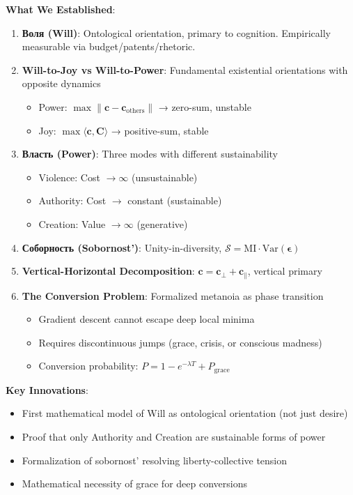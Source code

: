 \documentclass[11pt,a4paper]{article}
\theoremstyle{definition}
\theoremstyle{remark}
\newcommand{\cc}{\mathbf{c}}
\begin{document}
\begin{small}
\begin{enumerate}
\begin{mdframed}[backgroundcolor=green!10,linewidth=2pt,linecolor=green!70!black]
\textbf{What We Established}:
\begin{enumerate}[nosep]
    \item \textbf{Воля (Will)}: Ontological orientation, primary to cognition. Empirically measurable via budget/patents/rhetoric.
    \item \textbf{Will-to-Joy vs Will-to-Power}: Fundamental existential orientations with opposite dynamics
        \begin{itemize}[nosep]
            \item Power: \(\max \|\cc - \cc_{\text{others}}\|\) → zero-sum, unstable
            \item Joy: \(\max \langle \cc, \mathbf{C} \rangle\) → positive-sum, stable
        \end{itemize}
    \item \textbf{Власть (Power)}: Three modes with different sustainability
        \begin{itemize}[nosep]
            \item Violence: Cost \(\to \infty\) (unsustainable)
            \item Authority: Cost \(\to\) constant (sustainable)
            \item Creation: Value \(\to \infty\) (generative)
        \end{itemize}
    \item \textbf{Соборность (Sobornost')}: Unity-in-diversity, \(\mathcal{S} = \text{MI} \cdot \text{Var}(\boldsymbol{\epsilon})\)
    \item \textbf{Vertical-Horizontal Decomposition}: \(\cc = \cc_{\perp} + \cc_{\parallel}\), vertical primary
    \item \textbf{The Conversion Problem}: Formalized metanoia as phase transition
        \begin{itemize}[nosep]
            \item Gradient descent cannot escape deep local minima
            \item Requires discontinuous jumps (grace, crisis, or conscious madness)
            \item Conversion probability: \(P = 1 - e^{-\lambda T} + P_{\text{grace}}\)
        \end{itemize}
\end{enumerate}

\textbf{Key Innovations}:
\begin{itemize}[nosep]
    \item First mathematical model of Will as ontological orientation (not just desire)
    \item Proof that only Authority and Creation are sustainable forms of power
    \item Formalization of sobornost' resolving liberty-collective tension
    \item Mathematical necessity of grace for deep conversions
\end{itemize}


\end{mdframed}
\end{enumerate}
\end{small}
\end{document}
